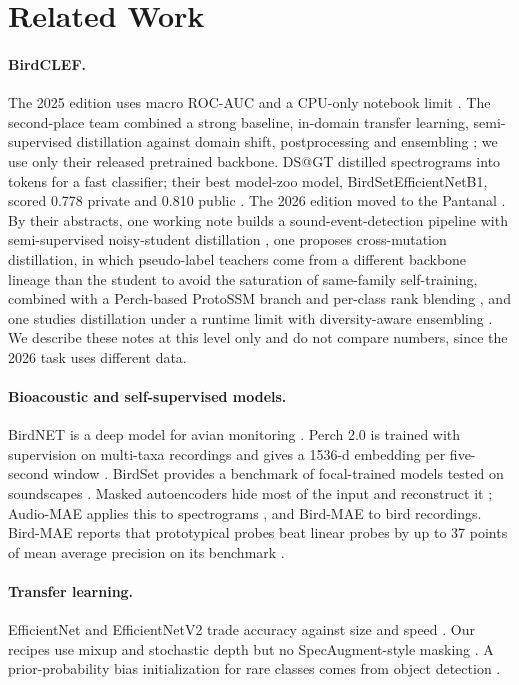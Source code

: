 \documentclass[letterpaper]{article} %
\begin{document}
\section{Related Work}
\paragraph{BirdCLEF.}
The 2025 edition uses macro ROC-AUC and a CPU-only notebook limit \citep{canas2025birdclef}. The second-place team combined a strong baseline, in-domain transfer learning, semi-supervised distillation against domain shift, postprocessing and ensembling \citep{sydorskyi2025tackling}; we use only their released pretrained backbone. DS@GT distilled spectrograms into tokens for a fast classifier; their best model-zoo model, BirdSetEfficientNetB1, scored 0.778 private and 0.810 public \citep{miyaguchi2025distilling}. The 2026 edition moved to the Pantanal \citep{kahl2026overview}. By their abstracts, one working note builds a sound-event-detection pipeline with semi-supervised noisy-student distillation \citep{chen2026class}, one proposes cross-mutation distillation, in which pseudo-label teachers come from a different backbone lineage than the student to avoid the saturation of same-family self-training, combined with a Perch-based ProtoSSM branch and per-class rank blending \citep{farazi2026crossmutated}, and one studies distillation under a runtime limit with diversity-aware ensembling \citep{banthia2026pantanal}. We describe these notes at this level only and do not compare numbers, since the 2026 task uses different data.

\paragraph{Bioacoustic and self-supervised models.}
BirdNET is a deep model for avian monitoring \citep{kahl2021birdnet}. Perch 2.0 is trained with supervision on multi-taxa recordings and gives a 1536-d embedding per five-second window \citep{vanmerrienboer2025perch}. BirdSet provides a benchmark of focal-trained models tested on soundscapes \citep{rauch2025birdset}. Masked autoencoders hide most of the input and reconstruct it \citep{he2022masked}; Audio-MAE applies this to spectrograms \citep{huang2022masked}, and Bird-MAE to bird recordings. Bird-MAE reports that prototypical probes beat linear probes by up to 37 points of mean average precision on its benchmark \citep{rauch2025can}.

\paragraph{Transfer learning.}
EfficientNet and EfficientNetV2 trade accuracy against size and speed \citep{tan2019efficientnet,tan2021efficientnetv2}. Our recipes use mixup \citep{zhang2018mixup} and stochastic depth \citep{huang2016deep} but no SpecAugment-style masking \citep{park2019specaugment}. A prior-probability bias initialization for rare classes comes from object detection \citep{lin2017focal}.
\end{document}
